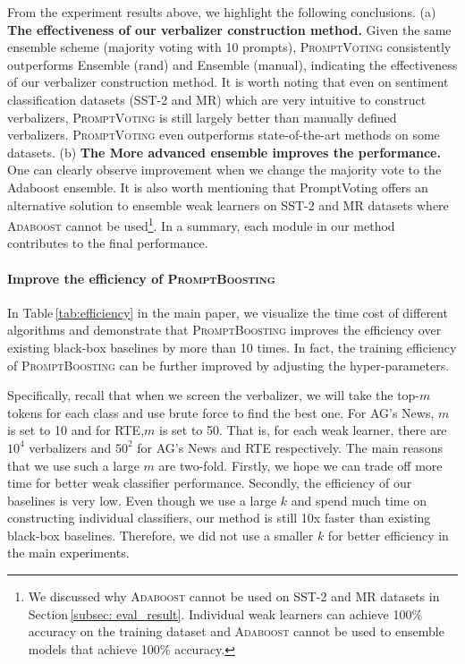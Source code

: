 \documentclass{article}
\theoremstyle{plain}
\theoremstyle{definition}
\theoremstyle{remark}
\newcommand{\alg}{\textsc{PromptBoosting}}
\begin{document}
From the experiment results above, we highlight the following conclusions. (a) \textbf{The effectiveness of our verbalizer construction method.} Given the same ensemble scheme (majority voting with 10 prompts), \textsc{PromptVoting} consistently outperforms Ensemble (rand) and Ensemble (manual), indicating the effectiveness of our verbalizer construction method. It is worth noting that even on sentiment classification datasets (SST-2 and MR) which are very intuitive to construct verbalizers, \textsc{PromptVoting} is still largely better than manually defined verbalizers. \textsc{PromptVoting} even outperforms state-of-the-art methods on some datasets. (b) \textbf{The More advanced ensemble improves the performance.} One can clearly observe improvement when we change the majority vote to the Adaboost ensemble. It is also worth mentioning that PromptVoting offers an alternative solution to ensemble weak learners on SST-2 and MR datasets where \textsc{Adaboost} cannot be used\footnote{We discussed why \textsc{Adaboost} cannot be used on SST-2 and MR datasets in Section\,\ref{subsec: eval_result}. Individual weak learners can achieve 100\% accuracy on the training dataset and \textsc{Adaboost} cannot be used to ensemble models that achieve 100\% accuracy.}. 
In a summary, each module in our method contributes to the final performance.

\paragraph{Improve the efficiency of {\alg}} 
In Table\,\ref{tab:efficiency} in the main paper, we visualize the time cost of different algorithms and demonstrate that {\alg} improves the efficiency over existing black-box baselines by more than 10 times. In fact, the training efficiency of {\alg} can be further improved by adjusting the hyper-parameters.

Specifically,  recall that when we screen the verbalizer, we will take the top-$m$ tokens for each class and use brute force to find the best one. For AG's News, $m$ is set to 10 and for RTE,$m$ is set to 50. That is, for each weak learner, there are $10^4$ verbalizers and $50^2$ for AG's News and RTE respectively. The main reasons that we use such a large $m$ are two-fold. Firstly, we hope we can trade off more time for better weak classifier performance. Secondly, the efficiency of our baselines is very low. Even though we use a large $k$ and spend much time on constructing individual classifiers, our method is still 10x faster than existing black-box baselines. Therefore, we did not use a smaller $k$ for better efficiency in the main experiments. 
\end{document}
